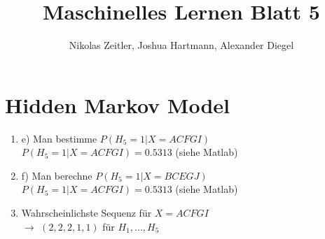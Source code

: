 \documentclass[a4paper]{scrartcl}
\author{Nikolas Zeitler, Joshua Hartmann, Alexander Diegel}
\title{Maschinelles Lernen Blatt 5}
\begin{document}
\maketitle
\section{Hidden Markov Model}
\begin{enumerate}
	\item e) Man bestimme $P(H_5=1|X=ACFGI)$\\
	$P(H_5=1|X=ACFGI) = 0.5313$ (siehe Matlab)
	\item f) Man berechne $P(H_5=1|X=BCEGJ)$\\
	$P(H_5=1|X=ACFGI) = 0.5313$ (siehe Matlab)
	\item Wahrscheinlichste Sequenz für $X=ACFGI$\\
	$\rightarrow$ $(2,2,2,1,1)$ für $H_1,...,H_5$
\end{enumerate}
\end{document}
